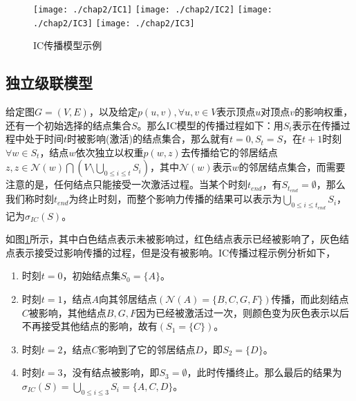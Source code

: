 \begin{figure}[H]
\centering%
	{\texttt{[image: ./chap2/IC1]}}
	\hspace{1mm}%
	{\texttt{[image: ./chap2/IC2]}}
	\hspace{1mm}%
	{\texttt{[image: ./chap2/IC3]}}
	\hspace{1mm}%
	{\texttt{[image: ./chap2/IC3]}}
	\caption{IC传播模型示例}
	\label{fig:IC-inf-diffusion}
\end{figure}


\subsection{独立级联模型}
\label{sec:IC-model-desc}
给定图$G=(V, E)$，以及给定$p(u, v), \forall u, v \in V$表示顶点$u$对顶点$v$的影响权重，还有一个初始选择的结点集合$S$。那么IC模型的传播过程如下：用$S_{t}$表示在传播过程中处于时间$t$时被影响(激活)的结点集合，那么就有$t=0, S_{t}=S$，在$t+1$时刻$\forall w \in S_{t}$，结点$w$依次独立以权重$p(w, z)$去传播给它的邻居结点$z, z \in \mathcal{N}(w) \bigcap (V \setminus \bigcup_{0 \leq i \leq t}S_{i})$，其中$\mathcal{N}(w)$表示$w$的邻居结点集合，而需要注意的是，任何结点只能接受一次激活过程。当某个时刻$t_{end}$，有$S_{t_{end}} = \emptyset$，那么我们称时刻$t_{end}$为终止时刻，而整个影响力传播的结果可以表示为$\bigcup_{0 \leq i \leq t_{end}}S_{i}$，记为$\sigma_{IC}(S)$。


如图\ref{fig:IC-inf-diffusion}所示，其中白色结点表示未被影响过，红色结点表示已经被影响了，灰色结点表示接受过影响传播的过程，但是没有被影响。IC传播过程示例分析如下，

\begin{enumerate}
\item 时刻$t=0$，初始结点集$S_{0}=\{A\}$。
\item 时刻$t=1$，结点$A$向其邻居结点$(\mathcal{N}(A)=\{B, C, G, F\})$传播，而此刻结点$C$被影响，其他结点$B, G, F$因为已经被激活过一次，则颜色变为灰色表示以后不再接受其他结点的影响，故有$(S_{1}=\{C\})$。
\item 时刻$t=2$，结点$C$影响到了它的邻居结点$D$，即$S_{2}=\{D\}$。
\item 时刻$t=3$，没有结点被影响，即$S_{3}=\emptyset$，此时传播终止。那么最后的结果为$\sigma_{IC}(S)=\bigcup_{0 \leq i \leq 3}S_{i}=\{A, C, D\}$。
\end{enumerate}


